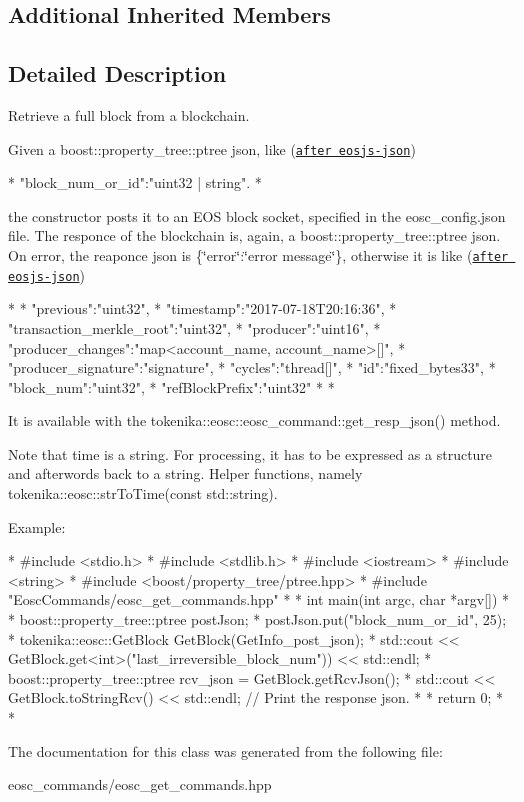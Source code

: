 \subsection*{Additional Inherited Members}


\subsection{Detailed Description}
Retrieve a full block from a blockchain. 

Given a {\ttfamily boost\+::property\+\_\+tree\+::ptree json}, like (\href{#https://github.com/EOSIO/eosjs-json/blob/master/api/v1/chain.json}{\tt after eosjs-\/json}) \begin{DoxyVerb}* {"block_num_or_id":"uint32 | string"}.
* \end{DoxyVerb}


the constructor posts it to an E\+OS block socket, specified in the {\ttfamily eosc\+\_\+config.\+json} file. The responce of the blockchain is, again, a {\ttfamily boost\+::property\+\_\+tree\+::ptree json}. On error, the reaponce json is \textquotesingle{}\{\char`\"{}error\char`\"{}\+:\char`\"{}error message\char`\"{}\}, otherwise it is like (\href{#https://github.com/EOSIO/eosjs-json/blob/master/api/v1/chain.json}{\tt after eosjs-\/json}) \begin{DoxyVerb}* {
* "previous":"uint32",
* "timestamp":"2017-07-18T20:16:36",
* "transaction_merkle_root":"uint32",
* "producer":"uint16",
* "producer_changes":"map<account_name, account_name>[]",
* "producer_signature":"signature",
* "cycles":"thread[]",
* "id":"fixed_bytes33",
* "block_num":"uint32",
* "refBlockPrefix":"uint32"
* }
* \end{DoxyVerb}


It is available with the tokenika\+::eosc\+::eosc\+\_\+command\+::get\+\_\+resp\+\_\+json() method.

Note that time is a string. For processing, it has to be expressed as a structure and afterwords back to a string. Helper functions, namely tokenika\+::eosc\+::strToTime(const std\+::string).

Example\+:

\begin{DoxyVerb}* #include <stdio.h>
* #include <stdlib.h>
* #include <iostream>
* #include <string>
* #include <boost/property_tree/ptree.hpp>
* #include "EoscCommands/eosc_get_commands.hpp"  
* 
* int main(int argc, char *argv[])
* {
* boost::property_tree::ptree postJson;
* postJson.put("block_num_or_id", 25);
* tokenika::eosc::GetBlock GetBlock(GetInfo_post_json);
* std::cout << GetBlock.get<int>("last_irreversible_block_num")) << std::endl;
* boost::property_tree::ptree rcv_json = GetBlock.getRcvJson();
* std::cout << GetBlock.toStringRcv() << std::endl; // Print the response json.
* 
* return 0;
* }
* \end{DoxyVerb}
 

The documentation for this class was generated from the following file\+:\begin{DoxyCompactItemize}
\item 
eosc\+\_\+commands/eosc\+\_\+get\+\_\+commands.\+hpp\end{DoxyCompactItemize}
